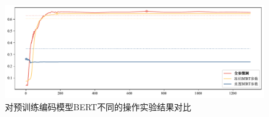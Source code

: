 \begin{figure}[htb]
	\centering
	\includegraphics[width=0.75\linewidth]{images/预训练BERT模型.pdf}
	\caption{对预训练编码模型BERT不同的操作实验结果对比}
	\label{fig:PreTraingBert}
\end{figure}